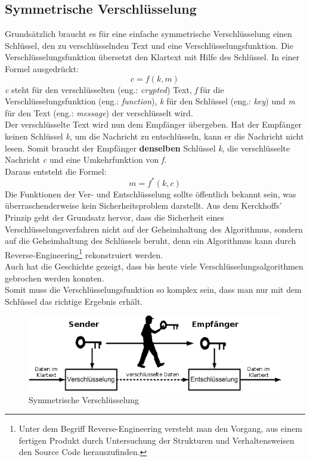 \subsection{Symmetrische Verschlüsselung}
Grundsätzlich braucht es für eine einfache symmetrische Verschlüsselung einen Schlüssel, den zu verschlüsselnden Text und eine Verschlüsselungsfunktion.
Die Verschlüsselungsfunktion übersetzt den Klartext mit Hilfe des Schlüssel. In einer Formel ausgedrückt:
\begin{equation*}
  c = f ( k, m )
\label{eqn:sym_versch}
\end{equation*}
\textit{c} steht für den verschlüsselten  (eng.: \textit{crypted}) Text, \textit{f} für die Verschlüsselungsfunktion (eng.: \textit{function}), \textit{k} für den Schlüssel (eng.: \textit{key}) und \textit{m} für den Text (eng.: \textit{message}) der verschlüsselt wird.\\
%
Der verschlüsselte Text wird nun dem Empfänger übergeben. Hat der Empfänger keinen Schlüssel \textit{k}, um die Nachricht zu entschlüsseln, kann er die Nachricht nicht lesen. Somit braucht der Empfänger \textbf{denselben} Schlüssel \textit{k}, die verschlüsselte Nachricht \textit{c} und eine Umkehrfunktion von \textit{f}.\\
Daraus entsteht die Formel:
\begin{equation*}
  m = f^*(k ,c)
\label{eqn:sym_entsch}
\end{equation*}
Die Funktionen der Ver- und Entschlüsselung sollte öffentlich bekannt sein, was überraschenderweise kein Sicherheitsproblem darstellt. Aus dem Kerckhoffs' Prinzip geht der Grundsatz hervor, dass die Sicherheit eines Verschlüsselungsverfahren nicht auf der Geheimhaltung des Algorithmus, sondern auf die Geheimhaltung des Schlüssels beruht, denn ein Algorithmus kann durch Reverse-Engineering\footnote{Unter dem Begriff Reverse-Engineering versteht man den Vorgang, aus einem fertigen Produkt durch Untersuchung der Strukturen und Verhaltensweisen den Source Code herauszufinden.} rekonstruiert werden.\\
Auch hat die Geschichte gezeigt, dass bis heute viele Verschlüsselungsalgorithmen gebrochen werden konnten. \cite{mod_kry}\\
%
Somit muss die Verschlüsselungsfunktion so komplex sein, dass man nur mit dem Schlüssel das richtige Ergebnis erhält.
%
\begin{figure}[ht]
\begin{center}
\includegraphics[width=15cm]{images/symmetrischeVerschluesselung.png}
\caption{Symmetrische Verschlüsselung}
\label{fig:symVersch}
\end{center}
\end{figure}
